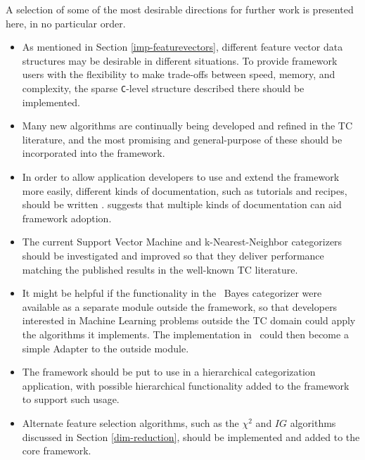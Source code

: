 A selection of some of the most desirable directions for further work
is presented here, in no particular order.

\begin{itemize}
\item As mentioned in Section \ref{imp-featurevectors}, different
  feature vector data structures may be desirable in different
  situations.  To provide framework users with the flexibility to make
  trade-offs between speed, memory, and complexity, the sparse
  \texttt{C}-level structure described there should be implemented.
\item Many new algorithms are continually being developed and refined
  in the TC literature, and the most promising and general-purpose of
  these should be incorporated into the framework.
\item In order to allow application developers to use and extend the
  framework more easily, different kinds of documentation, such as
  tutorials and recipes, should be written \cite{fayad:99}. suggests
  that multiple kinds of documentation can aid framework adoption.
\item The current Support Vector Machine and k-Nearest-Neighbor
  categorizers should be investigated and improved so that they
  deliver performance matching the published results in the well-known
  TC literature.
\item It might be helpful if the functionality in the \naive\ Bayes
  categorizer were available as a separate module outside the
  framework, so that developers interested in Machine Learning
  problems outside the TC domain could apply the algorithms it
  implements.  The implementation in \aicat\ could then become a
  simple Adapter to the outside module.
\item The framework should be put to use in a hierarchical
  categorization application, with possible hierarchical functionality
  added to the framework to support such usage.
\item Alternate feature selection algorithms, such as the $\chi^2$ and
  $IG$ algorithms discussed in Section \ref{dim-reduction}, should be
  implemented and added to the core framework.
\end{itemize}
